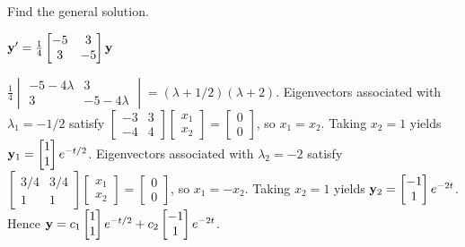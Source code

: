 \documentclass{ximera}
\begin{document}
\begin{problem}\label{exer:10.4.2} 
Find the general solution.

$ {\bf y}'=
\frac{1}{4}\begin{bmatrix}-5&3 \\3&-5\end{bmatrix}{\bf
y}$

\begin{solution}
    $\frac{1}{4}\begin{vmatrix}-5-4\lambda&3\\
3&-5-4\lambda\end{vmatrix}
=(\lambda+1/2)(\lambda+2)$.
Eigenvectors  associated with $\lambda_1=-1/2$  satisfy
$\begin{bmatrix}-3&3\\-4&4
\end{bmatrix}\begin{bmatrix}
x_1\\x_2\end{bmatrix}=\begin{bmatrix}0\\0\end{bmatrix}$,
so $x_1=x_2$.  Taking $x_2=1$ yields
${\bf y}_1=\begin{bmatrix}1 \\
1\end{bmatrix}e^{-t/2}$.
Eigenvectors  associated with $\lambda_2=-2$
satisfy
$\begin{bmatrix}3/4&3/4\\1&1
\end{bmatrix}\begin{bmatrix}
x_1\\x_2\end{bmatrix}=\begin{bmatrix} 0\\0\end{bmatrix}$,
so $x_1=-x_2$.  Taking $x_2=1$ yields
${\bf y}_2=\begin{bmatrix} -1\\
1\end{bmatrix}e^{-2t}$. Hence
 ${\bf y}= c_1\begin{bmatrix} 1\\1\end{bmatrix}e^{-t/2}+c_2\begin{bmatrix}-1\\1\end{bmatrix}e^{-2t}$.
\end{solution}
\end{problem}
\end{document}
